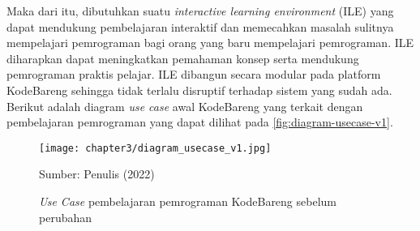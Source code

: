 Maka dari itu, dibutuhkan suatu \textit{interactive learning environment} (ILE) yang dapat mendukung pembelajaran interaktif dan memecahkan masalah sulitnya mempelajari pemrograman bagi orang yang baru mempelajari pemrograman. ILE diharapkan dapat meningkatkan pemahaman konsep serta mendukung pemrograman praktis pelajar. ILE dibangun secara modular pada platform KodeBareng sehingga tidak terlalu disruptif terhadap sistem yang sudah ada. Berikut adalah diagram \textit{use case} awal KodeBareng yang terkait dengan pembelajaran pemrograman yang dapat dilihat pada \autoref{fig:diagram-usecase-v1}.

\begin{figure}[H]
  \centering
  \texttt{[image: chapter3/diagram\_usecase\_v1.jpg]}
  \caption{\textit{Use Case} pembelajaran pemrograman KodeBareng sebelum perubahan} \label{fig:diagram-usecase-v1}
  Sumber: Penulis (2022)
\end{figure}